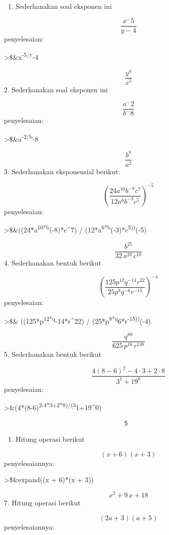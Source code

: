 \documentclass[
]{book}
\providecommand{\tightlist}{%
  \setlength{\itemsep}{0pt}\setlength{\parskip}{0pt}}
\begin{document}
\begin{enumerate}
\def\labelenumi{\arabic{enumi}.}
\tightlist
\item
  Sederhanakan soal eksponen ini
\end{enumerate}

\[\frac{x^-5}{y - 4}\]penyelesaian:

\textgreater\$\&x\textsuperscript{-5/y}-4

\[\frac{y^4}{x^5}\] 2. Sederhanakan soal eksponen ini

\[\frac{a^-2}{b^-8}\]penyelesaian:

\textgreater\$\&a\textsuperscript{-2/b}-8

\[\frac{b^8}{a^2}\] 3. Sederhanakan eksponensial berikut:

\[\left( \frac{24a^{10}b^{-8}c^{7}}{12a^{6}b^{-3}c^{5}} \right)^{-5}\]penyelesaian:

\textgreater\$\&((24*a\textsuperscript{10*b}(-8)*c\^{}7) / (12*a\textsuperscript{6*b}(-3)*c\textsuperscript{5))}(-5)

\[\frac{b^{25}}{32\,a^{20}\,c^{10}}\] 4. Sederhanakan bentuk berikut

\[\left( \frac{125p^{12}q^{-14}r^{22}}{25p^{8}q^{-6}r^{-15}} \right)^{-4}\]penyelesaian:

\textgreater\$\& ((125*p\textsuperscript{12*q}-14*r\^{}22) / (25*p\textsuperscript{8*q}6*r\textsuperscript{-15))}(-4)

\[\frac{q^{80}}{625\,p^{16}\,r^{148}}\] 5. Sederhanakan bentuk berikut

\[\frac{4(8 - 6)^2 - 4 \cdot 3 + 2 \cdot 8}{3^1 + 19^0}\]penyelesaian:

\textgreater\&(4*(8-6)\textsuperscript{2-4*3+2*8)/(3}1+19\^{}0)

\begin{verbatim}
                                  5
\end{verbatim}

\begin{enumerate}
\def\labelenumi{\arabic{enumi}.}
\setcounter{enumi}{5}
\tightlist
\item
  Hitung operasi berikut
\end{enumerate}

\[(x + 6)(x + 3)\]penyelesaiannya:

\textgreater\$\&expand((x + 6)*(x + 3))

\[x^2+9\,x+18\] 7. Hitung operasi berikut

\[(2a + 3)(a + 5)\]penyelesaiannya:
\end{document}
